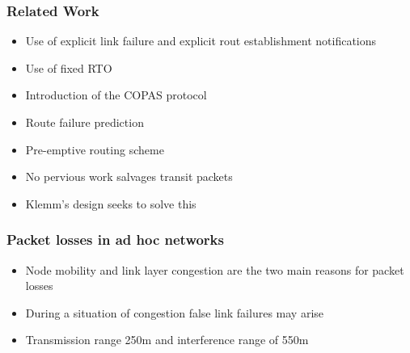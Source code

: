 \begin{frame}[t]
  \frametitle{Related Work}
  \begin{itemize}
  \item Use of explicit link failure and explicit rout establishment notifications
  \item Use of fixed RTO
  \item Introduction of the COPAS protocol
  \item Route failure prediction
  \item Pre-emptive routing scheme

  \item No pervious work salvages transit packets
  \item Klemm’s design seeks to solve this
  \end{itemize}

  \vfill

  \begin{flushleft}
    \begin{tiny}
      \begin{minipage}{1.0\linewidth}
      \end{minipage}
    \end{tiny}
  \end{flushleft}
  
\end{frame}

\begin{frame}[t]
  \frametitle{Packet losses in ad hoc networks}
  \begin{itemize}
  \item Node mobility and link layer congestion are the two main reasons for packet losses
  \item During a situation of congestion false link failures may arise
  \item Transmission range 250m and interference range of 550m
  \end{itemize}

  \vfill
  
  \begin{flushleft}
    \begin{tiny}
      \begin{minipage}{1.0\linewidth}
      \end{minipage}
    \end{tiny}
  \end{flushleft}
  
\end{frame}

